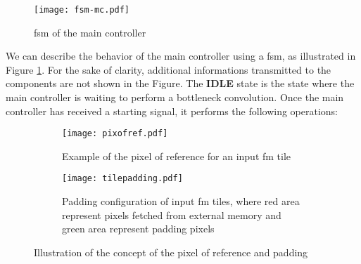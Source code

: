 %
\begin{figure}
    \centering
    \texttt{[image: fsm-mc.pdf]}
    \caption{\acrshort{fsm} of the main controller}
    \label{fig:fsm_mc}
\end{figure}
We can describe the behavior of the main controller using a \acrfull{fsm}, as illustrated in Figure \ref{fig:fsm_mc}. For the sake of clarity, additional informations transmitted to the components are not shown in the Figure. The \textbf{IDLE} state is the state where the main controller is waiting to perform a bottleneck convolution. Once the main controller has received a starting signal, it performs the following operations:
%
\begin{figure}
    \centering
    \begin{subfigure}[t]{.49\textwidth}
        \centering
        \texttt{[image: pixofref.pdf]}
        \caption{Example of the pixel of reference for an input \acrshort{fm} tile}
        \label{fig:pix_of_ref}
    \end{subfigure}
    \begin{subfigure}[t]{.49\textwidth}
        \centering
        \texttt{[image: tilepadding.pdf]}
        \caption{Padding configuration of input \acrshort{fm} tiles, where red area represent pixels fetched from external memory and green area represent padding pixels}
        \label{fig:tile_padding}
    \end{subfigure}
    \caption{Illustration of the concept of the pixel of reference and padding}
\end{figure}
%
